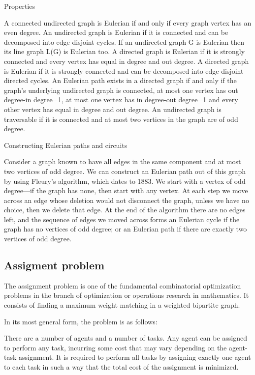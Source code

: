 \documentclass[10pt,letterpaper,twocolumn,twosided]{article}
\begin{document}
Properties

A connected undirected graph is Eulerian if and only if every graph vertex has an even degree.
An undirected graph is Eulerian if it is connected and can be decomposed into edge-disjoint cycles.
If an undirected graph G is Eulerian then its line graph L(G) is Eulerian too.
A directed graph is Eulerian if it is strongly connected and every vertex has equal in degree and out degree.
A directed graph is Eulerian if it is strongly connected and can be decomposed into edge-disjoint directed cycles.
An Eulerian path exists in a directed graph if and only if the graph's underlying undirected graph is connected, at most one vertex has out degree-in degree=1, at most one vertex has in degree-out degree=1 and every other vertex has equal in degree and out degree.
An undirected graph is traversable if it is connected and at most two vertices in the graph are of odd degree.

Constructing Eulerian paths and circuits

Consider a graph known to have all edges in the same component and at most two vertices of odd degree. We can construct an Eulerian path out of this graph by using Fleury's algorithm, which dates to 1883. We start with a vertex of odd degree—if the graph has none, then start with any vertex. At each step we move across an edge whose deletion would not disconnect the graph, unless we have no choice, then we delete that edge. At the end of the algorithm there are no edges left, and the sequence of edges we moved across forms an Eulerian cycle if the graph has no vertices of odd degree; or an Eulerian path if there are exactly two vertices of odd degree.

\subsection{Assigment problem}

The assignment problem is one of the fundamental combinatorial optimization problems in the branch of optimization or operations research in mathematics. It consists of finding a maximum weight matching in a weighted bipartite graph.

In its most general form, the problem is as follows:

There are a number of agents and a number of tasks. Any agent can be assigned to perform any task, incurring some cost that may vary depending on the agent-task assignment. It is required to perform all tasks by assigning exactly one agent to each task in such a way that the total cost of the assignment is minimized.
\end{document}
